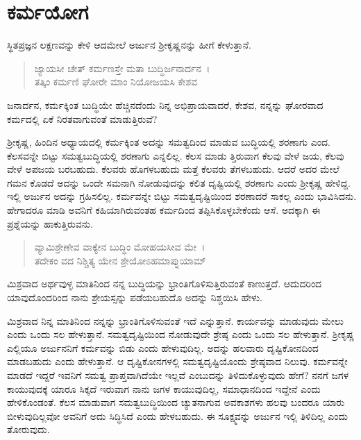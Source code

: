 
\chapter{ಕರ್ಮಯೋಗ}

ಸ್ಥಿತಪ್ರಜ್ಞನ ಲಕ್ಷಣವನ್ನು ಕೇಳಿ ಆದಮೇಲೆ ಅರ್ಜುನ ಶ‍್ರೀಕೃಷ್ಣನನ್ನು ಹೀಗೆ ಕೇಳುತ್ತಾನೆ.

\begin{verse}
ಜ್ಯಾಯಸೀ ಚೇತ್ ಕರ್ಮಣಸ್ತೇ ಮತಾ ಬುದ್ಧಿರ್ಜನಾರ್ದನ~।\\ತತ್ಕಿಂ ಕರ್ಮಣಿ ಘೋರೇ ಮಾಂ ನಿಯೋಜಯಸಿ ಕೇಶವ 
\end{verse}

{\small ಜನಾರ್ದನ, ಕರ್ಮಕ್ಕಿಂತ ಬುದ್ಧಿಯೇ ಹೆಚ್ಚಿನದೆಂದು ನಿನ್ನ ಅಭಿಪ್ರಾಯವಾದರೆ, ಕೇಶವ, ನನ್ನನ್ನು ಘೋರವಾದ ಕರ್ಮದಲ್ಲಿ ಏಕೆ ನಿರತವಾಗುವಂತೆ ಮಾಡುತ್ತಿರುವೆ?}

ಶ‍್ರೀಕೃಷ್ಣ, ಹಿಂದಿನ ಅಧ್ಯಾಯದಲ್ಲಿ ಕರ್ಮಕ್ಕಿಂತ ಅದನ್ನು ಸಮತ್ವದಿಂದ ಮಾಡುವ ಬುದ್ಧಿಯಲ್ಲಿ ಶರಣಾಗು ಎಂದ. ಕೆಲಸವನ್ನೇ ಬಿಟ್ಟು ಸಮತ್ವಬುದ್ಧಿಯಲ್ಲಿ ಶರಣಾಗು ಎನ್ನಲಿಲ್ಲ. ಕೆಲಸ ಮಾಡು ತ್ತಿರುವಾಗ ಕೆಲವು ವೇಳೆ ಜಯ, ಕೆಲವು ವೇಳೆ ಅಪಜಯ ಬರಬಹುದು. ಕೆಲವರು ಹೊಗಳಬಹುದು ಮತ್ತೆ ಕೆಲವರು ತೆಗಳಬಹುದು. ಆದರೆ ಅದರ ಮೇಲೆ ಗಮನ ಕೊಡದೆ ಅದನ್ನು ಒಂದೇ ಸಮನಾಗಿ ನೋಡುವುದನ್ನು ಕಲಿತ ದೃಷ್ಟಿಯಲ್ಲಿ ಶರಣಾಗು ಎಂದು ಶ‍್ರೀಕೃಷ್ಣ ಹೇಳಿದ್ದ. ಇಲ್ಲಿ ಅರ್ಜುನ ಅದನ್ನು ಗ್ರಹಿಸಲಿಲ್ಲ. ಕರ್ಮವನ್ನೇ ಬಿಟ್ಟು ಸಮತ್ವದೃಷ್ಟಿಯಿಂದ ಶರಣಾದರೆ ಸಾಕಲ್ಲ ಎಂದು ಭಾವಿಸಿದನು. ಹೇಗಾದರೂ ಮಾಡಿ ಅವನಿಗೆ ಕಹಿಯಾಗಿರುವಂತಹ ಕರ್ಮದಿಂದ ತಪ್ಪಿಸಿಕೊಳ್ಳಬೇಕೆಂದು ಆಸೆ. ಅದಕ್ಕಾಗಿ ಈ ಪ್ರಶ್ನೆಯನ್ನು ಹಾಕುತ್ತಿರುವನು.

\begin{verse}
ವ್ಯಾಮಿಶ್ರೇಣೇವ ವಾಕ್ಯೇನ ಬುದ್ಧಿಂ ಮೋಹಯಸೀವ ಮೇ~।\\ತದೇಕಂ ವದ ನಿಶ್ಚಿತ್ಯ ಯೇನ ಶ್ರೇಯೋಽಹಮಾಪ್ನುಯಾಮ್ 
\end{verse}

{\small ಮಿಶ್ರವಾದ ಅರ್ಥವುಳ್ಳ ಮಾತಿನಿಂದ ನನ್ನ ಬುದ್ಧಿಯನ್ನು ಭ್ರಾಂತಿಗೊಳಿಸುತ್ತಿರುವಂತೆ ಕಾಣುತ್ತದೆ. ಆದುದರಿಂದ ಯಾವುದೊಂದರಿಂದ ನಾನು ಶ್ರೇಯಸ್ಸನ್ನು ಪಡೆಯಬಹುದೊ ಅದನ್ನು ನಿಶ್ಚಯಿಸಿ ಹೇಳು.}

ಮಿಶ್ರವಾದ ನಿನ್ನ ಮಾತಿನಿಂದ ನನ್ನನ್ನು ಭ್ರಾಂತಿಗೊಳಿಸುವಂತೆ ಇದೆ ಎನ್ನುತ್ತಾನೆ. ಕಾರ್ಯವನ್ನು ಮಾಡುವುದು ಮೇಲು ಎಂದು ಒಂದು ಸಲ ಹೇಳುತ್ತಾನೆ. ಸಮತ್ವದೃಷ್ಟಿಯಿಂದ ನೋಡುವುದೇ ಶ್ರೇಷ್ಠ ಎಂದು ಒಂದು ಸಲ ಹೇಳುತ್ತಾನೆ. ಶ‍್ರೀಕೃಷ್ಣ ಎಲ್ಲಿಯೂ ಅರ್ಜುನನಿಗೆ ಕರ್ಮವನ್ನು ಬಿಡು ಎಂದು ಹೇಳುವುದಿಲ್ಲ. ಅದನ್ನು ಹಲವಾರು ದೃಷ್ಟಿಕೋನದಿಂದ ಮಾಡಬಹುದು ಎಂದು ಹೇಳುತ್ತಾನೆ. ಆ ದೃಷ್ಟಿಕೋನಗಳಲ್ಲಿ ಸಮತ್ವದೃಷ್ಟಿಯೊಂದು ಶ್ರೇಷ್ಠವಾದ ನಿಲುವು. ಕರ್ಮವನ್ನೇ ಮಾಡದೆ ಇದ್ದರೆ ಇವನಿಗೆ ಸಮತ್ವ ಪ್ರಾಪ್ತವಾಗಿದೆಯೇ ಇಲ್ಲವೆ ಎಂಬುದನ್ನು ತಿಳಿದುಕೊಳ್ಳುವುದು ಹೇಗೆ? ನನಗೆ ಜಗಳ ಕಾಯುವುದಕ್ಕೆ ಯಾರೂ ಸಿಕ್ಕದೆ ಇರುವಾಗ ನಾನು ಜಗಳ ಕಾಯುವುದಿಲ್ಲ, ಸಮಾಧಾನದಿಂದ ಇದ್ದೇನೆ ಎಂದು ಹೇಳಿಕೊಂಡಂತೆ. ಕೆಲಸ ಮಾಡುವಾಗ ಸಮತ್ವಬುದ್ಧಿಯಿಂದ ಚ್ಯುತನಾಗುವ ಅವಕಾಶಗಳು ಹಲವು ಬಂದರೂ ಯಾರು ಬೀಳುವುದಿಲ್ಲವೋ ಅವನಿಗೆ ಅದು ಸಿದ್ಧಿಸಿದೆ ಎಂದು ಹೇಳಬಹುದು. ಈ ಸೂಕ್ಷ್ಮವನ್ನು ಅರ್ಜುನ ಇಲ್ಲಿ ತಿಳಿದಿಲ್ಲ ಎಂದು ತೋರುವುದು.

